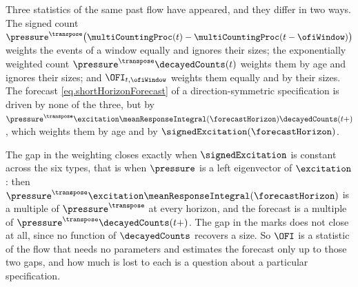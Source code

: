 \begin{remark}\label{remark.imbalanceAsProxy}
 Three statistics of the same past flow have appeared, and they differ in two ways.
 The signed count $\pressure^{\transpose}
 \big( \multiCountingProc(t) - \multiCountingProc(t-\ofiWindow) \big)$
 weights the events of a window equally and ignores their sizes;
 the exponentially weighted count $\pressure^{\transpose}\decayedCounts(t)$
 weights them by age and ignores their sizes;
 and $\OFI_{t,\ofiWindow}$ weights them equally and by their sizes.
 The forecast \eqref{eq.shortHorizonForecast} of a direction-symmetric specification
 is driven by none of the three,
 but by $\pressure^{\transpose}\excitation
 \meanResponseIntegral(\forecastHorizon)\decayedCounts(t+)$,
 which weights them by age and by $\signedExcitation(\forecastHorizon)$.

 The gap in the weighting closes exactly when $\signedExcitation$ is constant across the six
 types, that is when $\pressure$ is a left eigenvector of $\excitation$:
 then $\pressure^{\transpose}\excitation\meanResponseIntegral(\forecastHorizon)$ is a
 multiple of $\pressure^{\transpose}$ at every horizon,
 and the forecast is a multiple of $\pressure^{\transpose}\decayedCounts(t+)$.
 The gap in the marks does not close at all,
 since no function of $\decayedCounts$ recovers a size.
 So $\OFI$ is a statistic of the flow that needs no parameters and estimates the forecast
 only up to those two gaps, and how much is lost to each is a question about a particular
 specification.
\end{remark}

